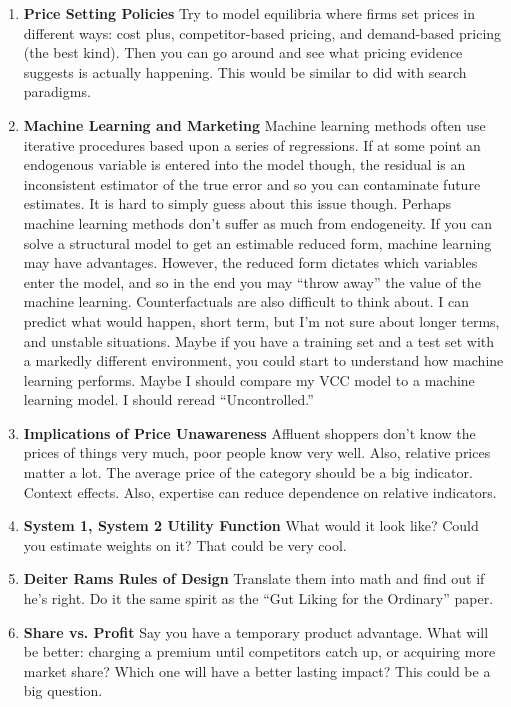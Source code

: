 \documentclass[paper=a4, fontsize=11pt]{scrartcl} %
\numberwithin{equation}{section} %
\numberwithin{figure}{section} %
\numberwithin{table}{section} %
\begin{document}
\begin{enumerate}
\item \textbf{Price Setting Policies}  Try to model equilibria where firms set prices in different ways: cost plus, competitor-based pricing, and demand-based pricing (the best kind).  Then you can go around and see what pricing evidence suggests is actually happening.  This would be similar to \cite{delossantos} did with search paradigms. 

\item \textbf{Machine Learning and Marketing}  Machine learning methods often use iterative procedures based upon a series of regressions.  If at some point an endogenous variable is entered into the model though, the residual is an inconsistent estimator of the true error and so you can contaminate future estimates.  It is hard to simply guess about this issue though.  Perhaps machine learning methods don't suffer as much from endogeneity.  
	If you can solve a structural model to get  an estimable reduced form, machine learning may have advantages.  However, the reduced form dictates which variables enter the model, and so in the end you may ``throw away'' the value of the machine learning.  
	Counterfactuals are also difficult to think about.  I can predict what would happen, short term, but I'm not sure about longer terms, and unstable situations.  Maybe if you have a training set and a test set with a markedly different environment, you could start to understand how machine learning performs.  Maybe I should compare my VCC model to a machine learning model.
	I should reread ``Uncontrolled.''

\item \textbf{Implications of Price Unawareness} Affluent shoppers don't know the prices of things very much, poor people know very well.  Also, relative prices matter a lot.  The average price of the category should be a big indicator.  Context effects.  Also, expertise can reduce dependence on relative indicators.  

\item \textbf{System 1, System 2 Utility Function} What would it look like?  Could you estimate weights on it?  That could be very cool.

\item \textbf{Deiter Rams Rules of Design} Translate them into math and find out if he's right.  Do it the same spirit as the ``Gut Liking for the Ordinary'' paper.

\item \textbf{Share vs. Profit} Say you have a temporary product advantage.  What will be better: charging a premium until competitors catch up, or acquiring more market share?  Which one will have a better lasting impact?  This could be a big question.


\end{enumerate}
\end{document}
